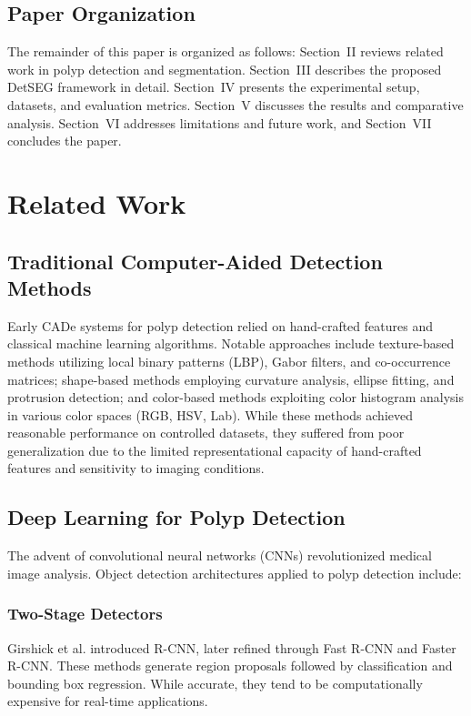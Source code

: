 \documentclass[conference]{IEEEtran}
\begin{document}
\subsection{Paper Organization}

The remainder of this paper is organized as follows: Section~II reviews related work in polyp detection and segmentation. Section~III describes the proposed DetSEG framework in detail. Section~IV presents the experimental setup, datasets, and evaluation metrics. Section~V discusses the results and comparative analysis. Section~VI addresses limitations and future work, and Section~VII concludes the paper.

\section{Related Work}

\subsection{Traditional Computer-Aided Detection Methods}

Early CADe systems for polyp detection relied on hand-crafted features and classical machine learning algorithms. Notable approaches include texture-based methods utilizing local binary patterns (LBP), Gabor filters, and co-occurrence matrices; shape-based methods employing curvature analysis, ellipse fitting, and protrusion detection; and color-based methods exploiting color histogram analysis in various color spaces (RGB, HSV, Lab). While these methods achieved reasonable performance on controlled datasets, they suffered from poor generalization due to the limited representational capacity of hand-crafted features and sensitivity to imaging conditions.

\subsection{Deep Learning for Polyp Detection}

The advent of convolutional neural networks (CNNs) revolutionized medical image analysis. Object detection architectures applied to polyp detection include:

\subsubsection{Two-Stage Detectors}
Girshick et al. introduced R-CNN, later refined through Fast R-CNN and Faster R-CNN. These methods generate region proposals followed by classification and bounding box regression. While accurate, they tend to be computationally expensive for real-time applications.
\end{document}
